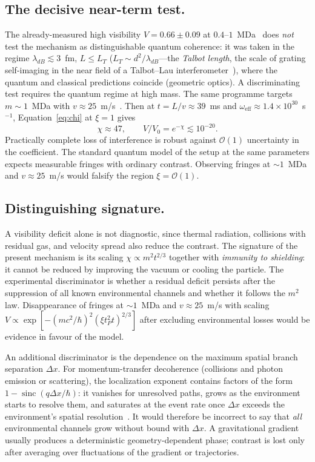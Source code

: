 \documentclass[11pt,a4paper]{article}
\begin{document}
\subsection{The decisive near-term test.}
\label{sec:decisive_test}

The already-measured high visibility $V=0.66\pm0.09$ at $0.4$--$1$~MDa~\cite{arndt2025} does \emph{not} test the mechanism as distinguishable quantum coherence: it was taken in the regime $\lambda_{dB}\lesssim3$~fm, $L\le L_T$ ($L_T\sim d^2/\lambda_{dB}$---the \emph{Talbot length}, the scale of grating self-imaging in the near field of a Talbot--Lau interferometer~\cite{arndt2025,kialka2022}), where the quantum and classical predictions coincide (geometric optics). A discriminating test requires the quantum regime at high mass. The same programme targets $m\sim 1$~MDa with $v\approx 25$~m/s~\cite{arndt2025}. Then at $t=L/v\approx 39$~ms and $\omega_{\mathrm{eff}}\approx 1.4\times10^{30}$~s$^{-1}$, Equation~\eqref{eq:chi} at $\xi=1$ gives
\begin{equation}
\chi\approx 47,
\qquad
V/V_0=e^{-\chi}\lesssim 10^{-20}.
\end{equation}
Practically complete loss of interference is robust against $\mathcal O(1)$ uncertainty in the coefficient. The standard quantum model of the setup at the same parameters expects measurable fringes with ordinary contrast. Observing fringes at $\sim\!1$~MDa and $v\approx25$~m/s would falsify the region $\xi=\mathcal O(1)$.

\subsection{Distinguishing signature.}
\label{sec:signature}

A visibility deficit alone is not diagnostic, since thermal radiation, collisions with residual gas, and velocity spread also reduce the contrast. The signature of the present mechanism is its scaling $\chi\propto m^2 t^{2/3}$ together with \emph{immunity to shielding}: it cannot be reduced by improving the vacuum or cooling the particle. The experimental discriminator is whether a residual deficit persists after the suppression of all known environmental channels and whether it follows the $m^2$ law. Disappearance of fringes at $\sim\!1$~MDa and $v\approx25$~m/s with scaling $V\propto\exp[-(mc^2/\hbar)^2(\xi t_P^2 t)^{2/3}]$ after excluding environmental losses would be evidence in favour of the model.

An additional discriminator is the dependence on the maximum spatial branch separation $\Delta x$. For momentum-transfer decoherence (collisions and photon emission or scattering), the localization exponent contains factors of the form $1-\operatorname{sinc}(q\Delta x/\hbar)$: it vanishes for unresolved paths, grows as the environment starts to resolve them, and saturates at the event rate once $\Delta x$ exceeds the environment's spatial resolution~\cite{hornberger2004tli}. It would therefore be incorrect to say that \emph{all} environmental channels grow without bound with $\Delta x$. A gravitational gradient usually produces a deterministic geometry-dependent phase; contrast is lost only after averaging over fluctuations of the gradient or trajectories.
\end{document}
